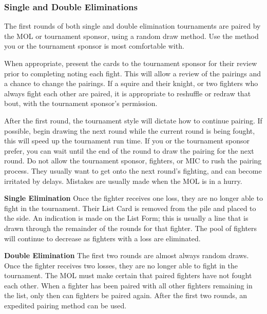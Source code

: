 \documentclass{article}
\begin{document}
\subsubsection*{Single and Double Eliminations}

The first rounds of both single and double elimination tournaments are paired by the MOL or tournament
sponsor, using a random draw method. Use the method you or the tournament sponsor is most
comfortable with.

When appropriate, present the cards to the tournament sponsor for their review prior to completing noting
each fight. This will allow a review of the pairings and a chance to change the pairings. If a squire and
their knight, or two fighters who always fight each other are paired, it is appropriate to reshuffle or redraw
that bout, with the tournament sponsor’s permission.

After the first round, the tournament style will dictate how to continue pairing. If possible, begin drawing
the next round while the current round is being fought, this will speed up the tournament run time. If you
or the tournament sponsor prefer, you can wait until the end of the round to draw the pairing for the next
round. Do not allow the tournament sponsor, fighters, or MIC to rush the pairing process. They usually
want to get onto the next round’s fighting, and can become irritated by delays. Mistakes are usually made
when the MOL is in a hurry.

\textbf{Single Elimination} Once the fighter receives one loss, they are no longer able to fight in the tournament. Their List Card is
removed from the pile and placed to the side. An indication is made on the List Form; this is usually a line
that is drawn through the remainder of the rounds for that fighter. The pool of fighters will continue to
decrease as fighters with a loss are eliminated.

\textbf{Double Elimination} The first two rounds are almost always random draws. Once the fighter receives two losses, they are no
longer able to fight in the tournament. The MOL must make certain that paired fighters have not fought
each other. When a fighter has been paired with all other fighters remaining in the list, only then can
fighters be paired again. After the first two rounds, an expedited pairing method can be used.
\end{document}
